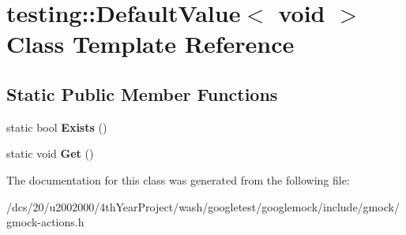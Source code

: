 \hypertarget{classtesting_1_1DefaultValue_3_01void_01_4}{}\section{testing\+:\+:Default\+Value$<$ void $>$ Class Template Reference}
\label{classtesting_1_1DefaultValue_3_01void_01_4}
\subsection*{Static Public Member Functions}
\begin{DoxyCompactItemize}
\item 
\mbox{\label{classtesting_1_1DefaultValue_3_01void_01_4_ae18ea46cbf928b820c91f15fa7aa317b}} 
static bool {\bfseries Exists} ()
\item 
\mbox{\label{classtesting_1_1DefaultValue_3_01void_01_4_acda4c367a5b0c0cfb28bc2289f385eed}} 
static void {\bfseries Get} ()
\end{DoxyCompactItemize}


The documentation for this class was generated from the following file\+:\begin{DoxyCompactItemize}
\item 
/dcs/20/u2002000/4th\+Year\+Project/wash/googletest/googlemock/include/gmock/gmock-\/actions.\+h\end{DoxyCompactItemize}
